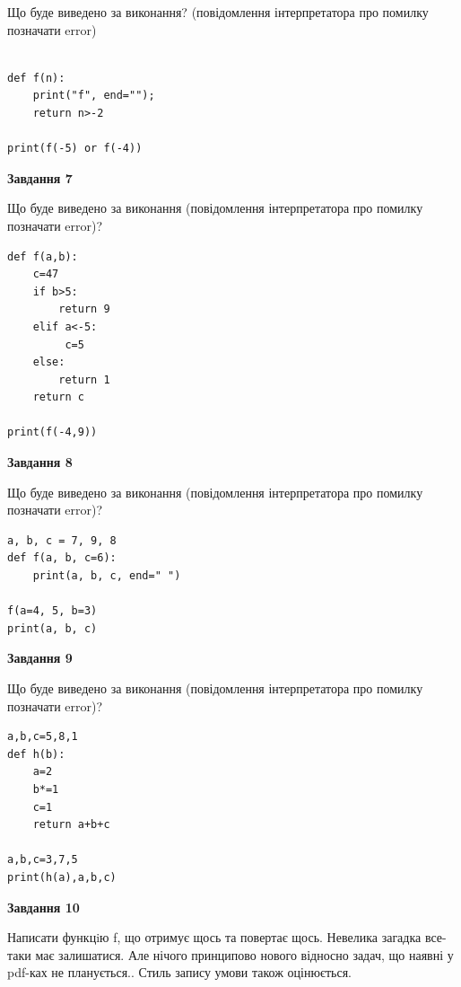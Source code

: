\documentclass[12pt, ukrainian]{article}
\begin{document}
{\begin {large}
Що буде виведено за виконання? (повідомлення інтерпретатора про помилку позначати error)\par
\begin{verbatim}

def f(n):
    print("f", end="");
    return n>-2

print(f(-5) or f(-4))
\end{verbatim}

{\begin {center}\textbf{Завдання 7}\end {center}}

Що буде виведено за виконання (повідомлення інтерпретатора про помилку позначати error)?\par
\begin{verbatim}
def f(a,b):
    c=47
    if b>5:
        return 9
    elif a<-5:
         c=5
    else: 
        return 1
    return c

print(f(-4,9))
\end{verbatim}

{\begin {center}\textbf{Завдання 8}\end {center}}

Що буде виведено за виконання (повідомлення інтерпретатора про помилку позначати error)?\par
\begin{verbatim}
a, b, c = 7, 9, 8
def f(a, b, c=6):
    print(a, b, c, end=" ")

f(a=4, 5, b=3)
print(a, b, c)
\end{verbatim}

{\begin {center}\textbf{Завдання 9}\end {center}}

Що буде виведено за виконання (повідомлення інтерпретатора про помилку позначати error)?\par
\begin{verbatim}
a,b,c=5,8,1
def h(b):
    a=2
    b*=1
    c=1
    return a+b+c

a,b,c=3,7,5
print(h(a),a,b,c)
\end{verbatim}

{\begin {center}\textbf{Завдання 10}\end {center}}


Написати функцiю f, що отримує щось та повертає щось. Невелика загадка все-таки має залишатися. Але нічого принципово нового відносно задач, що наявні у pdf-ках не планується.. Стиль запису умови також оцінюється.\par
\end {large}}
\newpage
\end{document}
